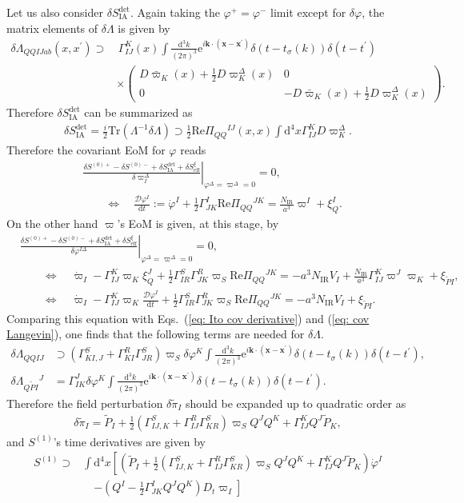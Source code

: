 \documentclass[aps, prd
, preprint
, nofootinbib 
, longbibliography
]{revtex4-1}
\newcommand{\dd}{\mathrm{d}}
\newcommand{\ee}{\mathrm{e}}
\newcommand{\IR}{\mathrm{IR}}
\renewcommand{\Re}{\mathrm{Re}}
\newcommand{\eff}{\mathrm{eff}}
\newcommand{\Tr}{\mathrm{Tr}}
\newcommand{\IA}{\mathrm{IA}}
\newcommand{\calD}{\mathcal{D}}
\newcommand{\bae}[1]{\begin{align} #1 \end{align}}
\newcommand{\bpme}[1]{\begin{pmatrix} #1 \end{pmatrix}}
\begin{document}
\bigskip

Let us also consider $\delta S_\IA^\mathrm{det}$.
Again taking the $\varphi^+=\varphi^-$ limit except for $\delta\varphi$, the matrix elements of $\delta\Lambda$ is given by
\bae{
    \delta\Lambda_{QQIJab}(x,x^\prime)\supset&\,\Gamma^K_{IJ}(x)\int\frac{\dd^3k}{(2\pi)^3}\ee^{i\mathbf{k}\cdot(\mathbf{x}-\mathbf{x}^\prime)}\delta(t-t_\sigma(k))\delta(t-t^\prime) \nonumber \\
    &\times\bpme{
        D\bar{\varpi}_K(x)+\frac{1}{2}D\varpi_K^\Delta(x) & 0 \\
        0 & -D\bar{\varpi}_K(x)+\frac{1}{2}D\varpi_K^\Delta(x)
    }.
}
Therefore $\delta S_\IA^\mathrm{det}$ can be summarized as
\bae{
    \delta S_\IA^\mathrm{det}=\frac{i}{2}\Tr(\Lambda^{-1}\delta\Lambda)\supset\frac{1}{2}\Re\Pi_{QQ}{}^{IJ}(x,x)\int\dd^4x\Gamma_{IJ}^KD\varpi_K^\Delta.
}
Therefore the covariant EoM for $\varphi$ reads
\bae{
	&\left.\frac{\delta S^{(0)+}-\delta S^{(0)-}+\delta S_\IA^\mathrm{det}+\delta S_\eff^\xi}{\delta\varpi_I^\Delta}\right|_{\varphi^\Delta=\varpi^\Delta=0}=0, \nonumber \\ &\qquad \Leftrightarrow
	\quad \frac{\calD\varphi^I}{\dd t}:=\dot{\varphi}^I+\frac{1}{2}\Gamma^I_{JK}\Re\Pi_{QQ}{}^{JK}=\frac{N_\IR}{a^3}\varpi^I+\xi_Q^I.
}
On the other hand $\varpi$'s EoM is given, at this stage, by
\bae{
    &\left.\frac{\delta S^{(0)+}-\delta S^{(0)-}+\delta S_\IA^\mathrm{det}+\delta S_\eff^\xi}{\delta\varphi^{I\Delta}}\right|_{\varphi^\Delta=\varpi^\Delta=0}=0, \nonumber \\
    &\qquad \Leftrightarrow \quad \dot{\varpi}_I-\Gamma_{IJ}^K\varpi_K\xi_Q^J+\frac{1}{2}\Gamma^S_{IR}\Gamma^R_{JK}\varpi_S\Re\Pi_{QQ}{}^{JK}=-a^3N_\IR V_I+\frac{N_\IR}{a^3}\Gamma_{IJ}^K\varpi^J\varpi_K+\xi_{\tilde{P}I}, \nonumber \\
    &\qquad \Leftrightarrow \quad
    \dot{\varpi}_I-\Gamma^K_{IJ}\varpi_K\frac{\calD\varphi^I}{\dd t}+\frac{1}{2}\Gamma^S_{IR}\Gamma^R_{JK}\varpi_S\Re\Pi_{QQ}{}^{JK}=-a^3N_\IR V_I+\xi_{\tilde{P}I}.
}
Comparing this equation with Eqs.~(\ref{eq: Ito cov derivative}) and (\ref{eq: cov Langevin}),
one finds that the following terms are needed for $\delta\Lambda$.
\bae{
    \delta\Lambda_{QQIJ}&\supset(\Gamma^S_{KI,J}+\Gamma^R_{KI}\Gamma^S_{JR})\varpi_S\delta\varphi^K\int\frac{\dd^3k}{(2\pi)^3}\ee^{i\mathbf{k}\cdot(\mathbf{x}-\mathbf{x}^\prime)}\delta(t-t_\sigma(k))\delta(t-t^\prime), \\
    \delta\Lambda_{Q\tilde{P}I}{}^J&=\Gamma^J_{IK}\delta\varphi^K\int\frac{\dd^3k}{(2\pi)^3}\ee^{i\mathbf{k}\cdot(\mathbf{x}-\mathbf{x}^\prime)}\delta(t-t_\sigma(k))\delta(t-t^\prime).
}
Therefore the field perturbation $\delta\tilde{\pi}_I$ should be expanded up to quadratic order as
\bae{\label{eq: expansion of delta pi}
    \delta\tilde{\pi}_I=\tilde{P}_I+\frac{1}{2}(\Gamma^S_{IJ,K}+\Gamma^R_{IJ}\Gamma^S_{KR})\varpi_SQ^JQ^K+\Gamma^K_{IJ}Q^J\tilde{P}_K,
}
and $S^{(1)}$'s time derivatives are given by
\bae{
    S^{(1)}\supset&\int\dd^4x\left[\left(\tilde{P}_I+\frac{1}{2}(\Gamma^S_{IJ,K}+\Gamma^R_{IJ}\Gamma^S_{KR})\varpi_SQ^JQ^K+\Gamma^K_{IJ}Q^J\tilde{P}_K\right)\dot{\varphi}^I \right. \nonumber \\
    &\quad\left.-\left(Q^I-\frac{1}{2}\Gamma^I_{JK}Q^JQ^K\right)D_t\varpi_I\right]
}
\end{document}
